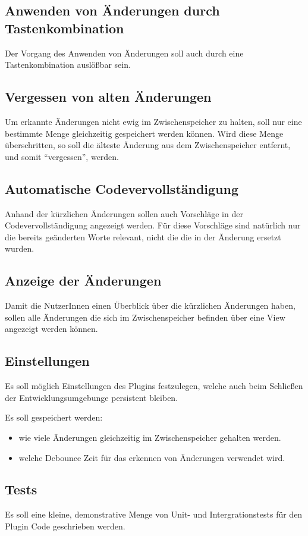 \subsection{Anwenden von Änderungen durch Tastenkombination}

Der Vorgang des Anwenden von Änderungen soll auch durch eine
Tastenkombination auslößbar sein.

\subsection{Vergessen von alten Änderungen}

Um erkannte Änderungen nicht ewig im Zwischenspeicher zu halten,
soll nur eine bestimmte Menge gleichzeitig gespeichert werden 
können. Wird diese Menge überschritten, so soll die älteste Änderung
aus dem Zwischenspeicher entfernt, und somit \enquote{vergessen}, werden.

\subsection{Automatische Codevervollständigung}

Anhand der kürzlichen Änderungen sollen auch Vorschläge
in der Codevervollständigung angezeigt werden. Für diese
Vorschläge sind natürlich nur die bereits geänderten Worte
relevant, nicht die die in der Änderung ersetzt wurden.

\subsection{Anzeige der Änderungen}

Damit die NutzerInnen einen Überblick über die kürzlichen Änderungen
haben, sollen alle Änderungen die sich im Zwischenspeicher befinden
über eine View angezeigt werden können.

\subsection{Einstellungen}

Es soll möglich Einstellungen des Plugins festzulegen, welche
auch beim Schließen der Entwicklungsumgebunge persistent bleiben.

Es soll gespeichert werden:
\begin{itemize}
    \item wie viele Änderungen gleichzeitig im 
        Zwischenspeicher gehalten werden.
    \item welche Debounce Zeit für das erkennen 
        von Änderungen verwendet wird. 
\end{itemize}

\subsection{Tests}

Es soll eine kleine, demonstrative Menge von Unit- und Intergrationstests für
den Plugin Code geschrieben werden.